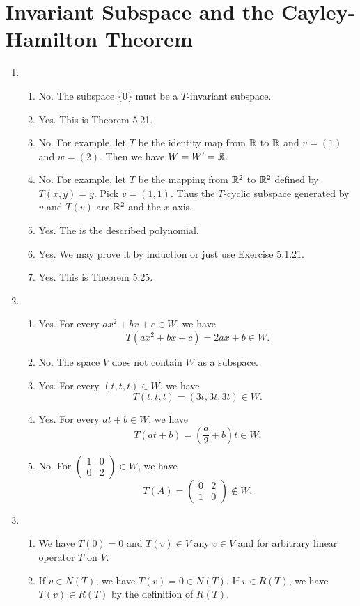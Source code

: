 \section{Invariant Subspace and the Cayley-Hamilton Theorem}
\begin{enumerate}
\item \begin{enumerate}
\item No. The subspace $\{0\}$ must be a $T$-invariant subspace.
\item Yes. This is Theorem 5.21.
\item No. For example, let $T$ be the identity map from $\mathbb{R}$ to $\mathbb{R}$ and $v=(1)$ and $w=(2)$. Then we have $W=W'=\mathbb{R}$.
\item No. For example, let $T$ be the mapping from $\mathbb{R}^2$ to $\mathbb{R}^2$ defined by $T(x,y)=y$. Pick $v=(1,1)$. Thus the $T$-cyclic subspace generated by $v$ and $T(v)$ are $\mathbb{R}^2$ and the $x$-axis.
\item Yes. The \charpoly{} is the described polynomial.
\item Yes. We may prove it by induction or just use Exercise 5.1.21.
\item Yes. This is Theorem 5.25.
\end{enumerate}
\item \begin{enumerate}
\item Yes. For every $ax^2+bx+c\in W$, we have 
\[T(ax^2+bx+c)=2ax+b\in W.\]
\item No.  The space $V$ does not contain $W$ as a subspace.
\item Yes. For every $(t,t,t)\in W$, we have 
\[T(t,t,t)=(3t,3t,3t)\in W.\]
\item Yes. For every $at+b\in W$, we have 
\[T(at+b)=(\frac{a}{2}+b)t\in W.\]
\item No. For $\begin{pmatrix}1&0\\0&2\end{pmatrix}\in W$, we have
\[T(A)=\begin{pmatrix}0&2\\1&0\end{pmatrix}\notin W.\]
\end{enumerate}
\item \begin{enumerate}
\item We have $T(0)=0$ and $T(v)\in V$ any $v\in V$ and for arbitrary linear operator $T$ on $V$.
\item If $v\in N(T)$, we have $T(v)=0\in N(T)$. If $v\in R(T)$, we have $T(v)\in R(T)$ by the definition of $R(T)$.

\end{enumerate}
\end{enumerate}
